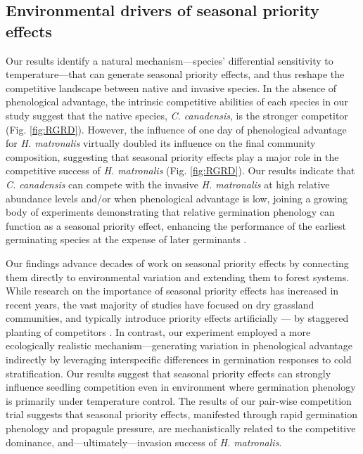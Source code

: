 \documentclass{article}[11pt]
\begin{document}
\subsection*{Environmental drivers of seasonal priority effects} 
Our results identify a natural mechanism---species' differential sensitivity to temperature---that can generate seasonal priority effects, and thus reshape the competitive landscape between native and invasive species. In the absence of phenological advantage, the intrinsic competitive abilities of each species in our study suggest that the native species, \textit{C. canadensis}, is the stronger competitor (Fig. \ref{fig:RGRD}). %
However, the influence of one day of phenological advantage for \textit{H. matronalis} virtually doubled its influence on the final community composition, suggesting that seasonal priority effects play a major role in the competitive success of \textit{H. matronalis} (Fig. \ref{fig:RGRD}). Our results indicate that \textit{C. canadensis} can compete with the invasive \textit{H. matronalis} at high relative abundance levels and/or when phenological advantage is low, joining a growing body of experiments demonstrating that relative germination phenology can function as a seasonal priority effect, enhancing the performance of the earliest germinating species at the expense of later germinants \citep{Korner2008,Dickson2012,Ross1972}.

Our findings advance decades of work on seasonal priority effects by connecting them directly to environmental variation and extending them to forest systems. While research on the importance of seasonal priority effects has increased in recent years, the vast majority of studies have focused on dry grassland communities, and typically introduce priority effects artificially --- by staggered planting of competitors \citep{Young:2017aa,Weidlich:2020aa}. In contrast, our experiment employed a more ecologically realistic mechanism---generating variation in phenological advantage indirectly by leveraging interspecific differences in germination responses to cold stratification. Our results suggest that seasonal priority effects can strongly influence seedling competition even in environment where germination phenology is primarily under temperature control. The results of our pair-wise competition trial suggests that seasonal priority effects, manifested through rapid germination phenology and propagule pressure, are mechanistically related to the competitive dominance, and---ultimately---invasion success of \textit{H. matronalis}. 
\end{document}

